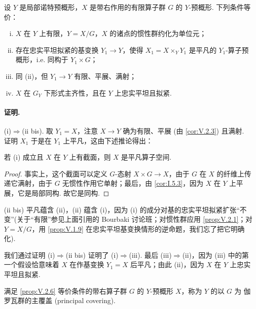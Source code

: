 \begin{proposition}\label{prop:V.2.6}
设 $Y$ 是局部诺特预概形，$X$ 是带右作用的有限算子群 $G$ 的 $Y$-预概形. 下列条件等价：
\begin{enumerate}[(i)]
\item $X$ 在 $Y$ 上有限，$Y = X/G$，$X$ 的诸点的惯性群约化为单位元；
\item 存在忠实平坦拟紧的基变换 $Y_1 \to Y$，使得 $X_1 = X \times_Y Y_1$ 是平凡的 $Y_1$-算子预概形，i.e. 同构于 $Y_1 \times G$；
\item[(ii bis)] 同 (ii)，但 $Y_1 \to Y$ 有限、平展、满射；
\item $X$ 在 $G_Y$ 下形式主齐性，且在 $Y$ 上忠实平坦且拟紧.
\end{enumerate}
\end{proposition}

\paragraph*{证明.} (i)$\Rightarrow$(ii bis). 取 $Y_1 = X$，注意 $X \to Y$ 确为有限、平展 (由 \ref{cor:V.2.3}) 且满射. 证明 $X_1$ 于是在 $Y_1$ 上平凡，这由下述推论得出：

\begin{corollary}\label{cor:V.2.7}
若 (i) 成立且 $X$ 在 $Y$ 上有截面，则 $X$ 是平凡算子空间.
\end{corollary}

\begin{proof}
事实上，这个截面可以定义 $G$-态射 $X \times G \to X$，由于 $G$ 在 $X$ 的纤维上传递它满射，由于 $G$ 无惯性作用它单射；最后，由 \ref{cor:I.5.3}，因为 $X$ 在 $Y$ 上平展，它是局部同构. 故它是同构.
\end{proof}

(ii bis) 平凡蕴含 (ii)，(ii) 蕴含 (i)，因为 (i) 的成分对基的忠实平坦拟紧扩张``不变''(关于``有限''参见上面引用的 Bourbaki 讨论班；对惯性群应用 \ref{prop:V.2.1}；对 $Y = X/G$，用 \ref{prop:V.1.9} 在忠实平坦基变换情形的逆命题，我们忘了把它明确化).

我们通过证明 (i)$\Rightarrow$(ii bis) 证明了 (i)$\Rightarrow$(iii). 最后 (iii)$\Rightarrow$(ii)，因为 (iii) 中的第一个假设恰意味着 $X$ 在作基变换 $Y_1 = X$ 后平凡；由此 (ii)，因为 $X$ 在 $Y$ 上忠实平坦且拟紧.

\begin{definition}\label{def:V.2.8}
满足 \ref{prop:V.2.6} 等价条件的带右算子群 $G$ 的 $Y$-预概形 $X$，称为 $Y$ 的以 $G$ 为 伽罗瓦群的主覆盖 (principal covering).
\end{definition}

